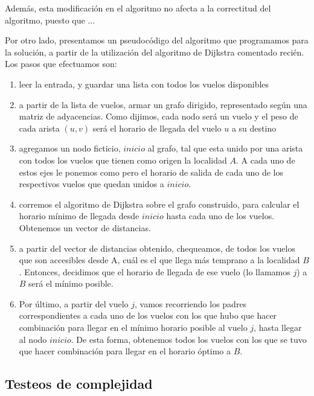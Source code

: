 \documentclass[11pt, a4paper, twoside]{article}
\begin{document}
\par Además, esta modificación en el algoritmo no afecta a la correctitud del algoritmo, puesto
que ...

\par Por otro lado, presentamos un pseudocódigo del algoritmo que programamos para la solución,
a partir de la utilización del algoritmo de Dijkstra comentado recién. Los pasos que efectuamos 
son: 
\begin{enumerate}
  \item leer la entrada, y guardar una lista con todos los vuelos disponibles
  \item a partir de la lista de vuelos, armar un grafo dirigido, representado según una matriz de 
        adyacencias. Como dijimos, cada nodo será un vuelo y el peso de cada arista $(u,v)$ será
        el horario de llegada del vuelo $u$ a su destino
  \item agregamos un nodo ficticio, $inicio$ al grafo, tal que esta unido por una arista con todos
        los vuelos que tienen como origen la localidad $A$. A cada uno de estos ejes le ponemos como
        pero el horario de salida de cada uno de los respectivos vuelos que quedan unidos a $inicio$.
  \item corremos el algoritmo de Dijkstra sobre el grafo construido, para calcular el horario mínimo 
        de llegada desde $inicio$ hasta cada uno de los vuelos. Obtenemos un vector de distancias.
  \item a partir del vector de distancias obtenido, chequeamos, de todos los vuelos que son accesibles
        desde A, cuál es el que llega más temprano a la localidad $B$. Entonces, decidimos que el horario
        de llegada de ese vuelo (lo llamamos $j$) a $B$ será el mínimo posible.
  \item Por último, a partir del vuelo $j$, vamos recorriendo los padres correspondientes a cada uno
        de los vuelos con los que hubo que hacer combinación para llegar en el mínimo horario posible
        al vuelo $j$, hasta llegar al nodo $inicio$. De esta forma, obtenemos todos los vuelos 
        con los que se tuvo que hacer combinación para llegar en el horario óptimo a $B$.
\end{enumerate}


\subsection{Testeos de complejidad}



\end{document}
